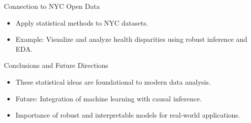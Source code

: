 \documentclass{beamer}
\begin{document}
\begin{frame}{Connection to NYC Open Data}
\begin{itemize}
    \item Apply statistical methods to NYC datasets.
    \item Example: Visualize and analyze health disparities using robust inference and EDA.
\end{itemize}
\end{frame}

\begin{frame}{Conclusions and Future Directions}
\begin{itemize}
    \item These statistical ideas are foundational to modern data analysis.
    \item Future: Integration of machine learning with causal inference.
    \item Importance of robust and interpretable models for real-world applications.
\end{itemize}
\end{frame}
\end{document}
